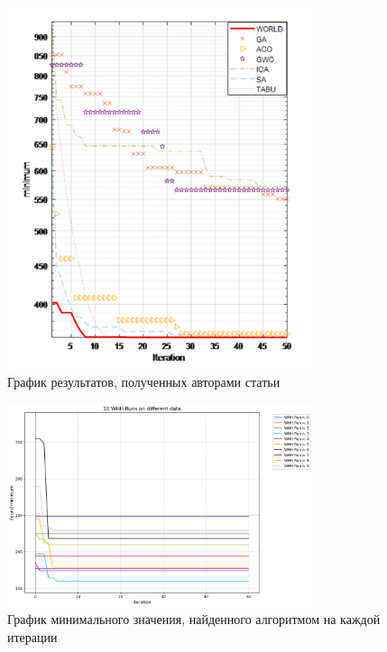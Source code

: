 \documentclass[a4paper,12pt]{extarticle}
\begin{document}
\begin{figure}[ht]
	\centering
	\includegraphics[width=0.8\textwidth]{authors_graph.png}
	\caption{График результатов, полученных авторами статьи}
	\label{fig:authors_graph}
\end{figure}

\begin{figure}[ht]
	\centering
	\includegraphics[width=0.8\textwidth]{10Runs.png}
	\caption{График минимального значения, найденного алгоритмом на каждой итерации}
	\label{fig:10runs}
\end{figure}
\end{document}
